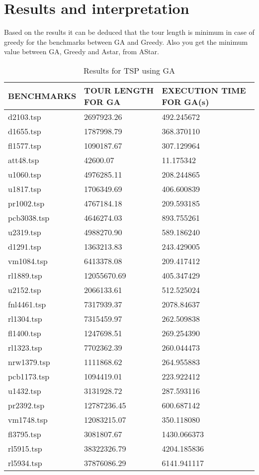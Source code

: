 \documentclass[a4paper]{article}
\begin{document}
\section{Results and interpretation}
Based on the results it can be deduced that the tour length is minimum in case of greedy for the benchmarks between GA and Greedy. Also you get the minimum value between GA, Greedy and Astar, from AStar.
\begin{table}
\centering
\begin{tabular}{ |p{3cm}|p{3cm}|p{3cm}|}

\hline
BENCHMARKS & TOUR LENGTH FOR GA& EXECUTION TIME FOR GA(s)\\
\hline
d2103.tsp&2697923.26&492.245672\\
\hline
d1655.tsp&1787998.79&368.370110\\
\hline
fl1577.tsp&1090187.67&307.129964\\
\hline
att48.tsp&42600.07&11.175342\\
\hline
u1060.tsp&4976285.11&208.244865\\
\hline
u1817.tsp&1706349.69&406.600839\\
\hline
pr1002.tsp&4767184.18&209.593185\\
\hline
pcb3038.tsp&4646274.03&893.755261\\
\hline
u2319.tsp&4988270.90&589.186240\\
\hline
d1291.tsp&1363213.83&243.429005\\
\hline
vm1084.tsp&6413378.08&209.417412\\
\hline
rl1889.tsp&12055670.69&405.347429\\
\hline
u2152.tsp&2066133.61&512.525024\\
\hline
fnl4461.tsp&7317939.37&2078.84637\\
\hline
rl1304.tsp&7315459.97&262.509838\\
\hline
fl1400.tsp&1247698.51&269.254390\\
\hline
rl1323.tsp&7702362.39&260.044473\\
\hline
nrw1379.tsp&1111868.62&264.955883\\
\hline
pcb1173.tsp&1094419.01&223.922412\\
\hline
u1432.tsp&3131928.72&287.593116\\
\hline
pr2392.tsp&12787236.45&600.687142\\
\hline
vm1748.tsp&12083215.07&350.118080\\
\hline
fl3795.tsp&3081807.67&1430.066373\\
\hline
rl5915.tsp&38322326.79&4204.185836\\
\hline
rl5934.tsp&37876086.29&6141.941117\\
\hline
\end{tabular}
\caption{Results for TSP using GA} \label{tab:GA}
\end{table}
\end{document}
